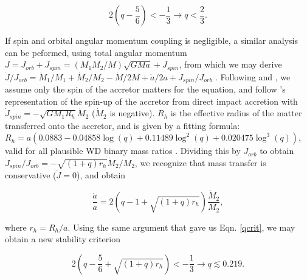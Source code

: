 \begin{equation}
2(q - \frac{5}{6}) < - \frac{1}{3} \rightarrow q < \frac{2}{3}.
\label{qcrit}
\end{equation}

If spin and orbital angular momentum coupling is negligible, a similar analysis can be peformed, using total angular momentum $J = J_{orb} + J_{spin} = (M_1M_2/M)\sqrt{GMa} + J_{spin}$, from which we may derive $\dot{J}/J_{orb} = \dot{M}_1/M_1 + \dot{M}_2/M_2 - \dot{M}/2M + \dot{a}/2a + \dot{J}_{spin}/J_{orb}$ \citep{marsns04}.  Following \citeauthor{marsns04} and \citeauthor{nele+01}, we assume only the spin of the accretor matters for the equation, and follow \cite{verbr88}'s representation of the spin-up of the accretor from direct impact accretion with $\dot{J}_{spin} = -\sqrt{GM_1R_h}\dot{M}_2$ ($\dot{M}_2$ is negative).  $R_h$ is the effective radius of the matter transferred onto the accretor, and is given by a fitting formula: $R_h = a(0.0883 - 0.04858\log({q}) + 0.11489{\log}^2(q) + 0.020475{\log}^3(q))$, valid for all plausible WD binary mass ratios \citep{verbr88}.  Dividing this by $J_{orb}$ to obtain $\dot{J}_{spin}/J_{orb} = -\sqrt{(1 + q)r_h}\dot{M}_2/M_2$, we recognize that mass transfer is conservative ($\dot{J} = 0$), and obtain \citep{marsns04,nele+01}

\begin{equation}
\frac{\dot{a}}{a} = 2(q - 1 + \sqrt{(1 + q)r_h})\frac{\dot{M}_2}{M_2},
\label{adotovera2}
\end{equation}

\noindent where $r_h = R_h/a$.  Using the same argument that gave us Eqn. \ref{qcrit}, we may obtain a new stability criterion \citep{nele+01,verbr88}

\begin{equation}
2(q - \frac{5}{6} + \sqrt{(1 + q)r_h}) < - \frac{1}{3} \rightarrow q \lesssim 0.219.
\label{qcrit2}
\end{equation}

